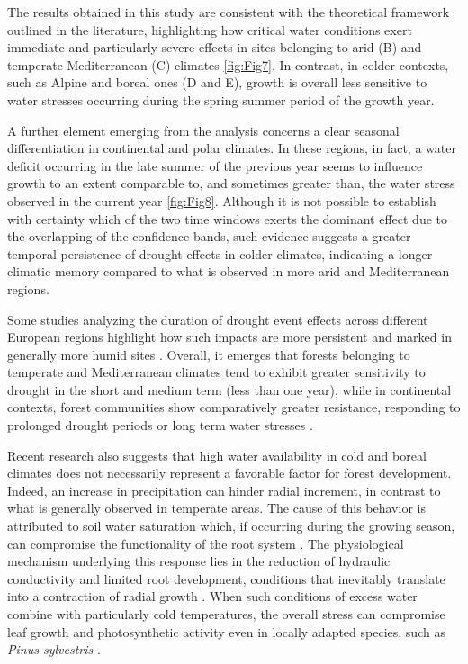 \documentclass[12pt, a4paper]{article}
\begin{document}
The results obtained in this study are consistent with the theoretical framework outlined in the literature, highlighting how critical water conditions exert immediate and particularly severe effects in sites belonging to arid (B) and temperate Mediterranean (C) climates \cref{fig:Fig7}. In contrast, in colder contexts, such as Alpine and boreal ones (D and E), growth is overall less sensitive to water stresses occurring during the spring summer period of the growth year.

A further element emerging from the analysis concerns a clear seasonal differentiation in continental and polar climates. In these regions, in fact, a water deficit occurring in the late summer of the previous year seems to influence growth to an extent comparable to, and sometimes greater than, the water stress observed in the current year \cref{fig:Fig8}. Although it is not possible to establish with certainty which of the two time windows exerts the dominant effect due to the overlapping of the confidence bands, such evidence suggests a greater temporal persistence of drought effects in colder climates, indicating a longer climatic memory compared to what is observed in more arid and Mediterranean regions.

Some studies analyzing the duration of drought event effects across different European regions highlight how such impacts are more persistent and marked in generally more humid sites \parencite{gazol2020}. Overall, it emerges that forests belonging to temperate and Mediterranean climates tend to exhibit greater sensitivity to drought in the short and medium term (less than one year), while in continental contexts, forest communities show comparatively greater resistance, responding to prolonged drought periods or long term water stresses \parencite{bhuyan2017}.

Recent research also suggests that high water availability in cold and boreal climates does not necessarily represent a favorable factor for forest development. Indeed, an increase in precipitation can hinder radial increment, in contrast to what is generally observed in temperate areas. The cause of this behavior is attributed to soil water saturation which, if occurring during the growing season, can compromise the functionality of the root system \parencite{lundgren2025}. The physiological mechanism underlying this response lies in the reduction of hydraulic conductivity and limited root development, conditions that inevitably translate into a contraction of radial growth \parencite{mirabel2023}. When such conditions of excess water combine with particularly cold temperatures, the overall stress can compromise leaf growth and photosynthetic activity even in locally adapted species, such as \textit{Pinus sylvestris} \parencite{roitto2019}.
\end{document}
